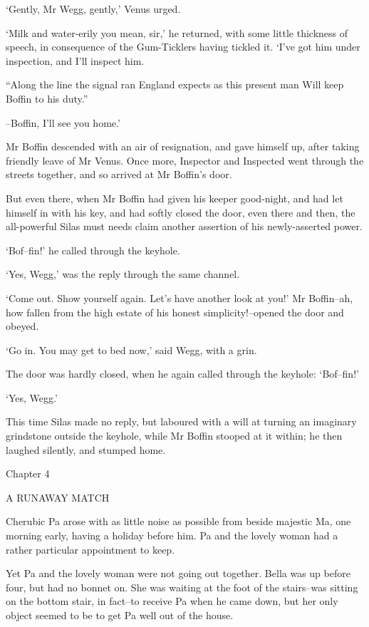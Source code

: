 ‘Gently, Mr Wegg, gently,’ Venus urged.

‘Milk and water-erily you mean, sir,’ he returned, with some little
thickness of speech, in consequence of the Gum-Ticklers having tickled
it. ‘I’ve got him under inspection, and I’ll inspect him.

     “Along the line the signal ran
     England expects as this present man
     Will keep Boffin to his duty.”

--Boffin, I’ll see you home.’

Mr Boffin descended with an air of resignation, and gave himself up,
after taking friendly leave of Mr Venus. Once more, Inspector and
Inspected went through the streets together, and so arrived at Mr
Boffin’s door.

But even there, when Mr Boffin had given his keeper good-night, and had
let himself in with his key, and had softly closed the door, even there
and then, the all-powerful Silas must needs claim another assertion of
his newly-asserted power.

‘Bof--fin!’ he called through the keyhole.

‘Yes, Wegg,’ was the reply through the same channel.

‘Come out. Show yourself again. Let’s have another look at you!’
Mr Boffin--ah, how fallen from the high estate of his honest
simplicity!--opened the door and obeyed.

‘Go in. You may get to bed now,’ said Wegg, with a grin.

The door was hardly closed, when he again called through the keyhole:
‘Bof--fin!’

‘Yes, Wegg.’

This time Silas made no reply, but laboured with a will at turning an
imaginary grindstone outside the keyhole, while Mr Boffin stooped at it
within; he then laughed silently, and stumped home.



Chapter 4

A RUNAWAY MATCH


Cherubic Pa arose with as little noise as possible from beside majestic
Ma, one morning early, having a holiday before him. Pa and the lovely
woman had a rather particular appointment to keep.

Yet Pa and the lovely woman were not going out together. Bella was up
before four, but had no bonnet on. She was waiting at the foot of the
stairs--was sitting on the bottom stair, in fact--to receive Pa when he
came down, but her only object seemed to be to get Pa well out of the
house.

